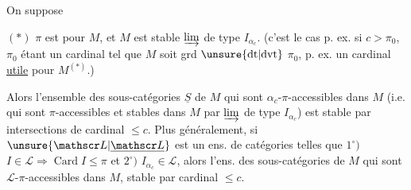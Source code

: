 On suppose

$(*)$  $\pi$ est  pour $M$, et $M$ est stable  $\varinjlim$ de
type $I_{\alpha_c}$. (c'est le cas p. ex. si  $c>\pi_0$, $\pi_0$ étant un
cardinal  tel que $M$ soit grd $\unsure{\mathrm{dt}|\mathrm{dvt}}$ $\pi_0$, p. ex. un
cardinal \uline{utile} pour $M^{(*)}$.)

Alors l'ensemble des sous-catégories $\underline S$ de $M$ qui
sont $\alpha_c$-$\pi$-accessibles dans $M$ (i.e. qui sont
$\pi$-accessibles et stables dans $M$ par $\varinjlim$ de type $I_{\alpha_c}$)
est stable par intersections de cardinal $\leq c$. Plus
généralement, si $\unsure{\mathscr L|\underline{\mathscr L}}$ est un ens. de catégories
telles que $1^\circ)$ $I\in\mathscr L\Longrightarrow\operatorname{Card} I\leq\pi$ et $2^\circ)$ $I_{\alpha_c}\in\mathscr L$,
alors l'ens. des sous-catégories de $M$ qui sont
$\mathscr L$-$\pi$-accessibles dans $M$,  stable par 
 cardinal $\leq c$.
\noindent\begin{minipage}[t]{.48\linewidth}
\end{minipage}\hfill
\begin{minipage}[t]{.48\linewidth}
\end{minipage}
